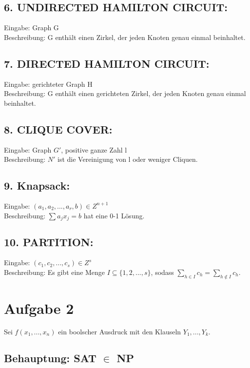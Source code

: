 \documentclass[a4paper,11pt,twoside]{article}
\begin{document}
\subsection*{6. UNDIRECTED HAMILTON CIRCUIT:}
Eingabe: Graph G\\
Beschreibung: G enthält einen Zirkel, der jeden Knoten genau einmal beinhaltet.\\

\subsection*{7. DIRECTED HAMILTON CIRCUIT:}
Eingabe: gerichteter Graph H\\
Beschreibung: G enthält einen gerichteten Zirkel, der jeden Knoten genau einmal beinhaltet. \\

\subsection*{8. CLIQUE COVER:}
Eingabe: Graph $G'$, positive ganze Zahl l\\
Beschreibung: $N'$ ist die Vereinigung von l oder weniger Cliquen.\\

\subsection*{9. Knapsack:}
Eingabe: $(a_1, a_2, ..., a_r, b) \in Z^{n+1}$\\
Beschreibung: $\sum a_j x_j = b$ hat eine 0-1 Lösung.\\

\subsection*{10. PARTITION:}
Eingabe: $(c_1, c_2, ..., c_s) \in Z^{s}$\\
Beschreibung: Es gibt eine Menge $I \subseteq \{1,2,...,s\}$, sodass $\sum_{h \in I} c_h = \sum_{h \notin I} c_h$.\\


\section*{Aufgabe 2}
Sei $f(x_1, ..., x_n)$ ein boolscher Ausdruck mit den Klauseln $Y_1, ..., Y_k$. 

\subsection*{Behauptung: SAT $\in$ NP}
\end{document}
